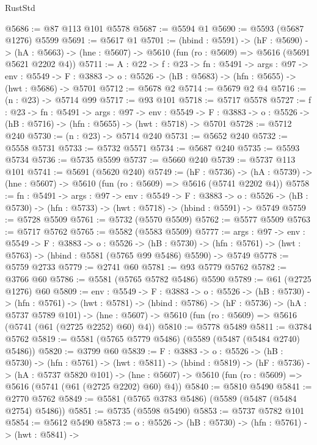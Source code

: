 \begin{lexlean}{RustStd}
\begin{coremodule}
@5686 := @87 @113 @101 @5578
@5687 := @5594 @1
@5690 := @5593 (@5687 @1276) @5599
@5691 := @5617 @1
@5701 := (hbind : @5591) ->
  (hF : @5690) ->
  (hA : @5663) -> (hne : @5607) -> @5610 (fun (ro : @5609) => @5616 (@5691 @5621 @2202 @4))
@5711 := {A : @22} ->
  {f : @23} ->
  {fn : @5491} ->
  {args : @97} ->
  {env : @5549} ->
  {F : @3883} -> {o : @5526} -> (hB : @5683) -> (hfn : @5655) -> (hwt : @5686) -> @5701
@5712 := @5678 @2
@5714 := @5679 @2 @4
@5716 := (n : @23) -> @5714 @99
@5717 := @93 @101
@5718 := @5717 @5578
@5727 := {f : @23} ->
  {fn : @5491} ->
  {args : @97} ->
  {env : @5549} ->
  {F : @3883} -> {o : @5526} -> (hB : @5716) -> (hfn : @5655) -> (hwt : @5718) -> @5701
@5728 := @5712 @240
@5730 := (n : @23) -> @5714 @240
@5731 := @5652 @240
@5732 := @5558 @5731
@5733 := @5732 @5571
@5734 := @5687 @240
@5735 := @5593 @5734
@5736 := @5735 @5599
@5737 := @5660 @240
@5739 := @5737 @113 @101
@5741 := @5691 (@5620 @240)
@5749 := (hF : @5736) ->
  (hA : @5739) -> (hne : @5607) -> @5610 (fun (ro : @5609) => @5616 (@5741 @2202 @4))
@5758 := {fn : @5491} ->
  {args : @97} ->
  {env : @5549} ->
  {F : @3883} ->
  {o : @5526} -> (hB : @5730) -> (hfn : @5733) -> (hwt : @5718) -> (hbind : @5591) -> @5749
@5759 := @5728 @5509
@5761 := @5732 (@5570 @5509)
@5762 := @5577 @5509
@5763 := @5717 @5762
@5765 := @5582 (@5583 @5509)
@5777 := {args : @97} ->
  {env : @5549} ->
  {F : @3883} ->
  {o : @5526} ->
  (hB : @5730) -> (hfn : @5761) -> (hwt : @5763) -> (hbind : @5581 (@5765 @99 @5486) @5590) -> @5749
@5778 := @5759 @2733
@5779 := @2741 @60
@5781 := @93 @5779 @5762
@5782 := @3766 @60
@5786 := @5581 (@5765 @5782 @5486) @5590
@5789 := @61 (@2725 @1276) @60
@5809 := {env : @5549} ->
  {F : @3883} ->
  {o : @5526} ->
  (hB : @5730) ->
  (hfn : @5761) ->
  (hwt : @5781) ->
  (hbind : @5786) ->
  (hF : @5736) ->
  (hA : @5737 @5789 @101) ->
  (hne : @5607) -> @5610 (fun (ro : @5609) => @5616 (@5741 (@61 (@2725 @2252) @60) @4))
@5810 := @5778 @5489
@5811 := @3784 @5762
@5819 := @5581 (@5765 @5779 @5486) (@5589 (@5487 (@5484 @2740) @5486))
@5820 := @3799 @60
@5839 := {F : @3883} ->
  {o : @5526} ->
  (hB : @5730) ->
  (hfn : @5761) ->
  (hwt : @5811) ->
  (hbind : @5819) ->
  (hF : @5736) ->
  (hA : @5737 @5820 @101) ->
  (hne : @5607) -> @5610 (fun (ro : @5609) => @5616 (@5741 (@61 (@2725 @2202) @60) @4))
@5840 := @5810 @5490
@5841 := @2770 @5762
@5849 := @5581 (@5765 @3783 @5486) (@5589 (@5487 (@5484 @2754) @5486))
@5851 := @5735 (@5598 @5490)
@5853 := @5737 @5782 @101
@5854 := @5612 @5490
@5873 := {o : @5526} ->
  (hB : @5730) ->
  (hfn : @5761) ->
  (hwt : @5841) ->

\end{coremodule}
\end{lexlean}
